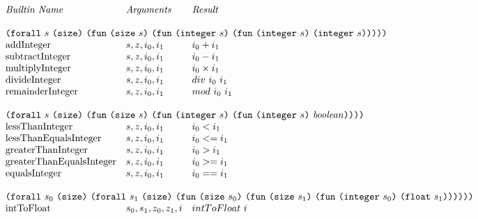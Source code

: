 \documentclass[../main.tex]{subfiles}
\begin{document}
\begin{figure*}[t]
    \centering
    \footnotesize
    \[\begin{array}{lll}
        \textit{Builtin Name}               & \textit{Arguments} & \textit{Result}\\
        &&\\
        
        \multicolumn{3}{l}{\forallT{s}{\sizeK{}}{\funT{\sizeT{s}}{\funT{\integerT{s}}{\funT{\integerT{s}}{\integerT{s}}}}}}\\
        \mathrm{addInteger}                 &  s, z, i_0 , i_1   &   i_0 + i_1             \\
        \mathrm{subtractInteger}            &  s, z, i_0 , i_1   &   i_0 - i_1             \\
        \mathrm{multiplyInteger}            &  s, z, i_0 , i_1   &   i_0 \times i_1        \\
        \mathrm{divideInteger}              &  s, z, i_0 , i_1   &   div ~ i_0 ~ i_1       \\
        \mathrm{remainderInteger}           &  s, z, i_0 , i_1   &   mod ~ i_0 ~ i_1       \\
        &&\\
        
        \multicolumn{3}{l}{\forallT{s}{\sizeK{}}{\funT{\sizeT{s}}{\funT{\integerT{s}}{\funT{\integerT{s}}{\mathit{boolean}}}}}}\\
        \mathrm{lessThanInteger}            &  s, z, i_0 , i_1   &   i_0 < i_1             \\
        \mathrm{lessThanEqualsInteger}      &  s, z, i_0 , i_1   &   i_0 <= i_1            \\
        \mathrm{greaterThanInteger}         &  s, z, i_0 , i_1   &   i_0 > i_1             \\
        \mathrm{greaterThanEqualsInteger}   &  s, z, i_0 , i_1   &   i_0 >= i_1            \\
        \mathrm{equalsInteger}              &  s, z, i_0 , i_1   &   i_0 == i_1            \\
        &&\\
        
        \multicolumn{3}{l}{\forallT{s_0}{\sizeK{}}{\forallT{s_1}{\sizeK{}}{\funT{\sizeT{s_0}}{\funT{\sizeT{s_1}}{\funT{\integerT{s_0}}{\floatT{s_1}}}}}}}\\
        \mathrm{intToFloat}                 &  s_0, s_1, z_0, z_1, i           &   intToFloat ~ i        \\
        &&\\
        

\end{array}\]
\end{figure*}
\end{document}
